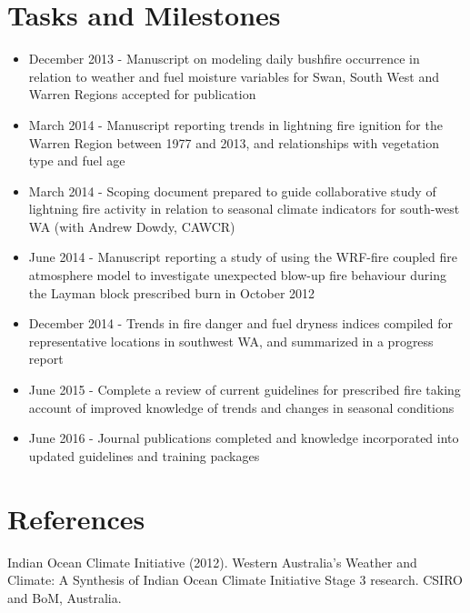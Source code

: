 \documentclass[version=last, paper=a4, DIV=18, usenames, dvipsnames]{scrartcl}
\begin{document}
\section{Tasks and Milestones}



\begin{itemize}

  \item December 2013 - Manuscript on modeling daily bushfire occurrence in relation to weather and fuel moisture variables for Swan, South West and Warren Regions accepted for publication

  \item March 2014 - Manuscript reporting trends in lightning fire ignition for the Warren Region between 1977 and 2013, and relationships with vegetation type and fuel age

  \item March 2014 - Scoping document prepared to guide collaborative study of lightning fire activity in relation to seasonal climate indicators for south-west WA (with Andrew Dowdy, CAWCR)

  \item June 2014 - Manuscript reporting a study of using the WRF-fire coupled fire atmosphere model to investigate unexpected blow-up fire behaviour during the Layman block prescribed burn in October 2012

  \item December 2014 - Trends in fire danger and fuel dryness indices compiled for representative locations in southwest WA, and summarized in a progress report

  \item June 2015 - Complete a review of current guidelines for prescribed fire taking account of improved knowledge of trends and changes in seasonal conditions

  \item June 2016 - Journal publications completed and knowledge incorporated into updated guidelines and training packages

\end{itemize}






\section{References}



Indian Ocean Climate Initiative (2012). Western Australia's Weather and Climate: A Synthesis of Indian Ocean Climate Initiative Stage 3 research. CSIRO and BoM, Australia.
\end{document}
